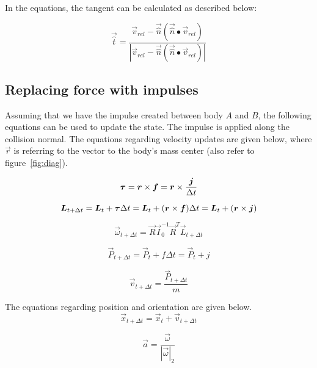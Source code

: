 In the equations, the tangent can be calculated as described below:

\begin{equation}
  \vec{\hat{t}}=\frac{\vec{v}_{rel}-\vec{\hat{n}}(\vec{\hat{n}}\bullet\vec{v}_{rel})}{|\vec{v}_{rel}-\vec{\hat{n}}(\vec{\hat{n}}\bullet\vec{v}_{rel})|}
\end{equation}

\subsection{Replacing force with impulses}
Assuming that we have the impulse created between body $A$ and $B$, the following
equations can be used to update the state. The impulse is applied along the collision normal.
The equations regarding velocity updates are given below, where $\vec{r}$
is referring to the vector to the body's mass center (also refer to figure~\ref{fig:diag}).

\begin{equation}
  \boldsymbol{\tau} = \boldsymbol{r}\times\boldsymbol{f} = \boldsymbol{r}\times\frac{\boldsymbol{j}}{\Delta t}
\end{equation}

\begin{equation}
  \boldsymbol{L}_{t+\Delta t} = \boldsymbol{L}_t + \boldsymbol\tau \Delta t = \boldsymbol{L}_t +(\boldsymbol{r}\times\boldsymbol{f})\Delta t = \boldsymbol{L}_t + (\boldsymbol{r}\times\boldsymbol{j})
\end{equation}

\begin{equation}
  \vec{\omega}_{t+\Delta t} = \vec{R}\vec{I}_0^{-1}\vec{R}^T\vec{L}_{t+\Delta t}
\end{equation}

\begin{equation}
  \vec{P}_{t+\Delta t} = \vec{P}_t + f\Delta t =\vec{P}_t+j
\end{equation}

\begin{equation}
  \vec{v}_{t+\Delta t} = \frac{\vec{P}_{t+\Delta t}}{m}
\end{equation}

The equations regarding position and orientation are given below.
\begin{equation}
  \vec{x}_{t+\Delta t} = \vec{x}_t+\vec{v}_{t+\Delta t}
\end{equation}

\begin{equation}
  \vec{a} = \frac{\vec{\omega}}{|\vec{\omega}|_2}
\end{equation}

